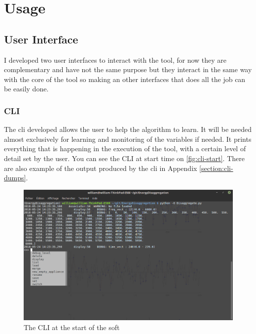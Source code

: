 \chapter{Usage}
\section{User Interface}
I developed two user interfaces to interact with the tool, for now they are complementary and have not the same purpose but they interact in the same way with the core of the tool so making an other interfaces that does all the job can be easily done.
\subsection{CLI}
The \acrlong{cli} developed allows the user to help the algorithm to learn. It will be needed almost exclusively for learning and monitoring of the variables if needed. It prints everything that is happening in the execution of the tool, with a certain level of detail set by the user. You can see the CLI at start time on \autoref{fig:cli-start}. There are also example of the output produced by the \acrshort{cli} in Appendix \ref{section:cli-dumps}.
\begin{figure}
    \centering
    \includegraphics[width=\textwidth]{img/cli-start.png}
    \caption{The CLI at the start of the soft}
    \label{fig:cli-start}
\end{figure}

